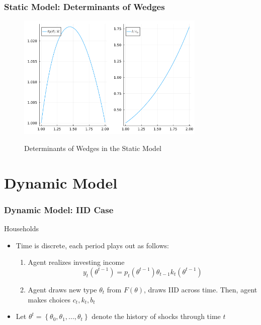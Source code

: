 \documentclass{beamer}
\begin{document}
\begin{frame}
    \frametitle{Static Model: Determinants of Wedges}

    \begin{figure}[htbp]
        \centering
        \caption{Determinants of Wedges in the Static Model}
        \includegraphics[width = 0.8\textwidth]{figures/determs.png}
        \label{fig:determs}
    \end{figure}
    

\end{frame}

\section{Dynamic Model}
\begin{frame}
    \frametitle{Dynamic Model: IID Case}

    Households
    \begin{itemize}
        \item Time is discrete, each period plays out as follows: 
        \begin{enumerate}
            \item Agent realizes investing income 
            \begin{equation*}
                y_{t}\left(\theta^{t-1}\right)=p_{t}\left(\theta^{t-1}\right)\theta_{t-1}k_{t}\left(\theta^{t-1}\right)
            \end{equation*} 
            \item Agent draws new type \( \theta_t \) from \( F(\theta) \), draws IID across time. Then, agent makes choices \( c_t , k_t, b_t \)
        \end{enumerate} 
        \item Let $\theta^{t}=\left\{ \theta_{0},\theta_{1},...,\theta_{t}\right\} $ denote the history of shocks through time \( t \)
    \end{itemize}

\end{frame}
\end{document}
